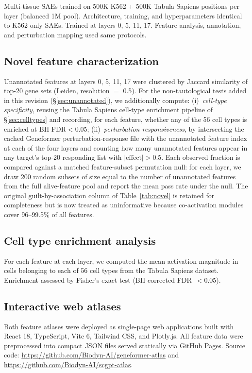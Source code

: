 \documentclass[onecolumn]{article}
\begin{document}
Multi-tissue SAEs trained on 500K K562 + 500K Tabula Sapiens positions per layer (balanced 1M pool). Architecture, training, and hyperparameters identical to K562-only SAEs. Trained at layers 0, 5, 11, 17. Feature analysis, annotation, and perturbation mapping used same protocols.

\subsection{Novel feature characterization}

Unannotated features at layers 0, 5, 11, 17 were clustered by Jaccard similarity of top-20 gene sets (Leiden, resolution $=$ 0.5). For the non-tautological tests added in this revision (\S\ref{sec:unannotated}), we additionally compute: (i)~\emph{cell-type specificity}, reusing the Tabula Sapiens cell-type enrichment pipeline of \S\ref{sec:celltypes} and recording, for each feature, whether any of the 56 cell types is enriched at BH FDR$<$0.05; (ii)~\emph{perturbation responsiveness}, by intersecting the cached Geneformer perturbation-response file with the unannotated feature index at each of the four layers and counting how many unannotated features appear in any target's top-20 responding list with $|\text{effect}|>0.5$. Each observed fraction is compared against a matched feature-subset permutation null: for each layer, we draw 200 random subsets of size equal to the number of unannotated features from the full alive-feature pool and report the mean pass rate under the null. The original guilt-by-association column of Table~\ref{tab:novel} is retained for completeness but is now treated as uninformative because co-activation modules cover 96--99.5\% of all features.

\subsection{Cell type enrichment analysis}

For each feature at each layer, we computed the mean activation magnitude in cells belonging to each of 56 cell types from the Tabula Sapiens dataset. Enrichment assessed by Fisher's exact test (BH-corrected FDR~$< 0.05$).

\subsection{Interactive web atlases}

Both feature atlases were deployed as single-page web applications built with React 18, TypeScript, Vite 6, Tailwind CSS, and Plotly.js. All feature data were preprocessed into compact JSON files served statically via GitHub Pages. Source code: \url{https://github.com/Biodyn-AI/geneformer-atlas} and \url{https://github.com/Biodyn-AI/scgpt-atlas}.
\end{document}
